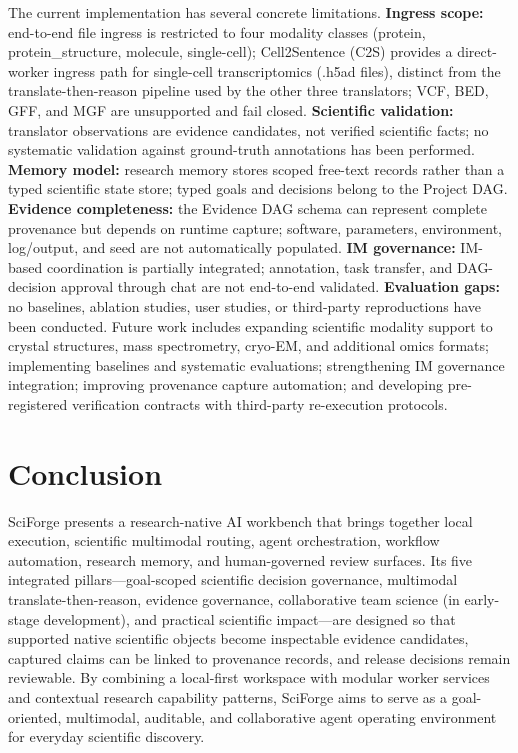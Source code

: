 \documentclass[sn-basic,Numbered,pdflatex]{sn-jnl}
\begin{document}
The current implementation has several concrete limitations. \textbf{Ingress scope:} end-to-end file ingress is restricted to four modality classes (protein, protein\_structure, molecule, single-cell); Cell2Sentence (C2S) provides a direct-worker ingress path for single-cell transcriptomics (.h5ad files), distinct from the translate-then-reason pipeline used by the other three translators; VCF, BED, GFF, and MGF are unsupported and fail closed. \textbf{Scientific validation:} translator observations are evidence candidates, not verified scientific facts; no systematic validation against ground-truth annotations has been performed. \textbf{Memory model:} research memory stores scoped free-text records rather than a typed scientific state store; typed goals and decisions belong to the Project DAG. \textbf{Evidence completeness:} the Evidence DAG schema can represent complete provenance but depends on runtime capture; software, parameters, environment, log/output, and seed are not automatically populated. \textbf{IM governance:} IM-based coordination is partially integrated; annotation, task transfer, and DAG-decision approval through chat are not end-to-end validated. \textbf{Evaluation gaps:} no baselines, ablation studies, user studies, or third-party reproductions have been conducted. Future work includes expanding scientific modality support to crystal structures, mass spectrometry, cryo-EM, and additional omics formats; implementing baselines and systematic evaluations; strengthening IM governance integration; improving provenance capture automation; and developing pre-registered verification contracts with third-party re-execution protocols.

\section{Conclusion}

SciForge presents a research-native AI workbench that brings together local execution, scientific multimodal routing, agent orchestration, workflow automation, research memory, and human-governed review surfaces. Its five integrated pillars---goal-scoped scientific decision governance, multimodal translate-then-reason, evidence governance, collaborative team science (in early-stage development), and practical scientific impact---are designed so that supported native scientific objects become inspectable evidence candidates, captured claims can be linked to provenance records, and release decisions remain reviewable. By combining a local-first workspace with modular worker services and contextual research capability patterns, SciForge aims to serve as a goal-oriented, multimodal, auditable, and collaborative agent operating environment for everyday scientific discovery.
\end{document}
